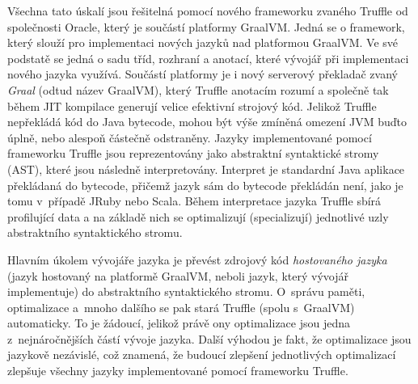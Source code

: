 \documentclass[
  master,
  biblatex,
  figures=true,
  theorems,
  sourcecodes,
  glossaries,
  index
]{kidiplom}
\begin{document}
Všechna tato úskalí jsou řešitelná pomocí nového frameworku zvaného Truffle od společnosti Oracle, který je součástí platformy GraalVM. Jedná se o framework, který slouží pro implementaci nových jazyků nad platformou GraalVM. Ve své podstatě se jedná o sadu tříd, rozhraní a anotací, které vývojář při implementaci nového jazyka využívá. Součástí platformy je i nový serverový překladač zvaný \textit{Graal} (odtud název GraalVM), který Truffle anotacím rozumí a společně tak během JIT kompilace generují velice efektivní strojový kód. Jelikož Truffle nepřekládá kód do Java bytecode, mohou být výše zmíněná omezení JVM buďto úplně, nebo alespoň částečně odstraněny. Jazyky implementované pomocí frameworku Truffle jsou reprezentovány jako abstraktní syntaktické stromy (AST), které jsou následně interpretovány. Interpret je standardní Java aplikace překládaná do bytecode, přičemž jazyk sám do bytecode překládán není, jako je tomu v~případě JRuby nebo Scala. Během interpretace jazyka Truffle sbírá profilující data a na základě nich se optimalizují (specializují) jednotlivé uzly abstraktního syntaktického stromu. 


Hlavním úkolem vývojáře jazyka je převést zdrojový kód \textit{hostovaného jazyka} (jazyk hostovaný na platformě GraalVM, neboli jazyk, který vývojář implementuje) do abstraktního syntaktického stromu. O~správu paměti, optimalizace a~mnoho dalšího se pak stará Truffle (spolu s~GraalVM) automaticky. To je žádoucí, jelikož právě ony optimalizace jsou jedna z~nejnáročnějších částí vývoje jazyka. Další výhodou je fakt, že optimalizace jsou jazykově nezávislé, což znamená, že budoucí zlepšení jednotlivých optimalizací zlepšuje všechny jazyky implementované pomocí frameworku Truffle.  
\end{document}

